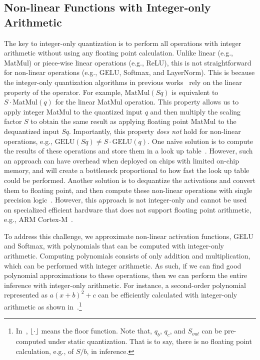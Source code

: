 \subsection{\textbf{ Non-linear Functions with Integer-only Arithmetic}}

The key to integer-only quantization is to perform all operations with integer arithmetic without using any floating point calculation.
Unlike linear (e.g., MatMul) or piece-wise linear operations (e.g., ReLU), this is not straightforward for non-linear operations (e.g., GELU, Softmax, and LayerNorm). 
This is because the integer-only quantization algorithms in previous works~\cite{yao2020hawqv3, jacob2018quantization} rely on the linear property of the operator.
For example, $\mathrm{MatMul}(Sq)$ is equivalent to $S\cdot \mathrm{MatMul}(q)$ 
for the linear MatMul operation.
This property allows us to apply integer MatMul to the quantized input $q$ and then multiply the scaling factor $S$ to obtain the same result as applying floating point MatMul to the dequantized input $Sq$. 
Importantly, this property \emph{does not} hold for non-linear operations, e.g., $\mathrm{GELU}(Sq) \not=S\cdot \mathrm{GELU}(q)$.
One na\"ive solution is to compute the results of these operations and store them in a look up table~\cite{lai2018cmsis}. 
However, such an approach can have overhead when deployed on chips with limited on-chip memory,
and will create a bottleneck proportional to how fast the look up table could be performed.
Another solution is to dequantize the activations and convert them to floating point, and then compute these non-linear operations with single precision logic~\cite{zafrir2019q8bert, bhandare2019efficient}.
However, this approach is not integer-only and cannot be used on specialized efficient hardware that does not support floating point arithmetic, e.g., ARM Cortex-M~\cite{armcortexm}.

To address this challenge, we approximate non-linear activation functions, GELU and Softmax, with polynomials that can be computed with integer-only arithmetic.
Computing polynomials consists of only addition and multiplication, 
which can be performed with integer arithmetic.
As such, if we can find good polynomial approximations to these operations, then we can perform the entire inference with integer-only
arithmetic. 
For instance, a second-order polynomial represented as $a(x+b)^2+c$ can be efficiently calculated with integer-only arithmetic as shown in~.\footnote{In~, $\lfloor \cdot \rfloor$ means the floor function. Note that, $q_b$, $q_c$, and $S_{out}$ can be pre-computed under static quantization. That is to say, there is no floating point calculation, e.g., of $S/b$, in inference.}



